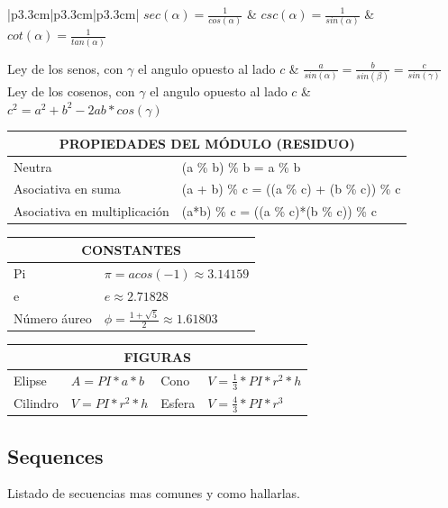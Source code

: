 \documentclass[10pt,landscape,twocolumn,letterpaper,twosided]{article}
\begin{document}
\begin{center}
{\begin{tabular}{|p{3.3cm}|p{3.3cm}|p{3.3cm}|}
	$sec(\alpha) = \displaystyle\frac{1}{cos(\alpha)}$ 
		& $csc(\alpha) = \displaystyle\frac{1}{sin(\alpha)}$
		& $cot(\alpha) = \displaystyle\frac{1}{tan(\alpha)}$ \\ \hline
	
	Ley de los senos, con $\gamma$ el angulo opuesto al lado $c$ &  {$\displaystyle\frac{a}{sin(\alpha)} 
		= \frac{b}{sin(\beta)} = \frac{c}{sin(\gamma)}$ } \\ \hline
	Ley de los cosenos, con $\gamma$ el angulo opuesto al lado $c$ &  {$ c^{2} = 
		a^{2}+b^{2}-2ab*cos(\gamma)$ } \\ \hline
	
\end{tabular}

\begin{tabular}{|p{2.2cm}|p{8.2cm}|}
	\hline
	\multicolumn{2}{|c|}{PROPIEDADES DEL MÓDULO (RESIDUO)} \\  \hline
	Neutra & (a \% b) \% b = a \% b \\ \hline
	Asociativa en suma & (a + b) \% c = ((a \% c) + (b \% c)) \% c \\ \hline
	Asociativa en multiplicación &  (a*b) \% c = ((a \% c)*(b \% c)) \% c \\ \hline
\end{tabular}

\begin{tabular}{|p{2.2cm}|p{8.2cm}|}
	\hline
	\multicolumn{2}{|c|}{CONSTANTES} \\ \hline
	Pi & $\pi = acos(-1) \approx 3.14159$ \\ \hline
	e & $e \approx 2.71828$ \\ \hline
	Número áureo & $\phi = \displaystyle\frac{1 + \sqrt{5}}{2} \approx 1.61803$  \\ \hline
\end{tabular}

\begin{tabular}{|p{2.0cm}|p{2.8cm}|p{2.0cm}|p{2.8cm}|}
	\hline
	\multicolumn{4}{|c|}{FIGURAS} \\ \hline
	Elipse & $A = PI*a*b $ & Cono & $ V = \frac{1}{3} * PI*r^{2}*h$ \\ \hline
	Cilindro & $V = PI*r^{2}*h$ & Esfera & $V = \frac{4}{3}*PI*r^{3}$  \\ \hline
\end{tabular}

}
\end{center}


\subsection{Sequences}
Listado de secuencias mas comunes y como hallarlas.
\end{document}
